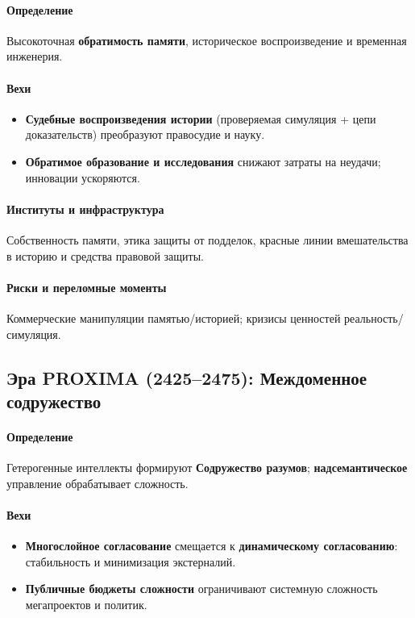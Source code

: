\documentclass[11pt]{article}
\begin{document}
\paragraph{Определение} Высокоточная \textbf{обратимость памяти}, историческое воспроизведение и временная инженерия.

\paragraph{Вехи}
\begin{itemize}[noitemsep]
  \item \textbf{Судебные воспроизведения истории} (проверяемая симуляция + цепи доказательств) преобразуют правосудие и науку.
  \item \textbf{Обратимое образование и исследования} снижают затраты на неудачи; инновации ускоряются.
\end{itemize}

\paragraph{Институты и инфраструктура} Собственность памяти, этика защиты от подделок, красные линии вмешательства в историю и средства правовой защиты.

\paragraph{Риски и переломные моменты} Коммерческие манипуляции памятью/историей; кризисы ценностей реальность/симуляция.

\subsection{Эра PROXIMA (2425–2475): Междоменное содружество}
\paragraph{Определение} Гетерогенные интеллекты формируют \textbf{Содружество разумов}; \textbf{надсемантическое} управление обрабатывает сложность.

\paragraph{Вехи}
\begin{itemize}[noitemsep]
  \item \textbf{Многослойное согласование} смещается к \textbf{динамическому согласованию}: стабильность и минимизация экстерналий.
  \item \textbf{Публичные бюджеты сложности} ограничивают системную сложность мегапроектов и политик.
\end{itemize}
\end{document}
